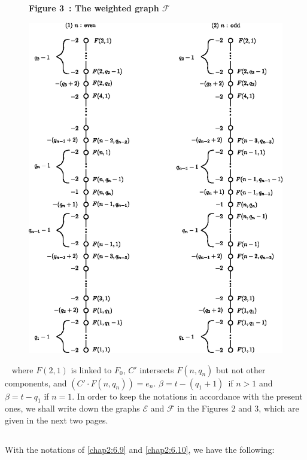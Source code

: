 \begin{figure}[H]
\centerline{{\bf Figure 3~: The weighted graph {\boldmath$\mathscr{F}$}}}

\bigskip
\centering
\includegraphics[scale=.9]{figures/chap2-fig30.eps}
\end{figure}\pageoriginale\
\noindent
where $F(2,1)$ is linked to $F_{0}$, $C'$ intersects $F(n,q_{n})$ but
not other components, and $(C'\cdot
F(n,q_{n}))=e_{n}$. $\beta=t-(q_{1}+1)$\pageoriginale\ if $n>1$ and
$\beta=t-q_{1}$ if $n=1$. In order to keep the notations in accordance
with the present ones, we shall write down the graphs $\mathscr{E}$
and $\mathscr{F}$ in the Figures 2 and 3, which are given in the next
two pages.

\subsection{}\label{chap2:6.11}
With the notations of \ref{chap2:6.9} and \ref{chap2:6.10}, we have the following:

